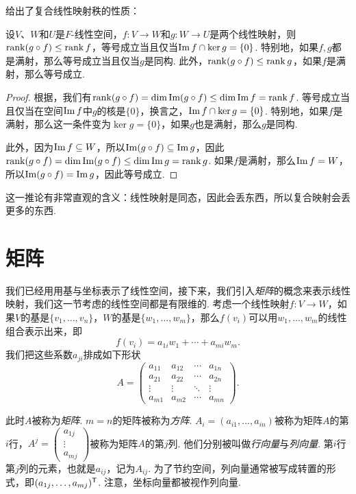  给出了复合线性映射秩的性质：
\begin{corollary}\label{cor:rank-composition}
设$V$、$W$和$U$是$F$-线性空间，$f:V\to W$和$g:W\to U$是两个线性映射，则$\operatorname*{rank} (g\circ f)\leq \operatorname*{rank} f$，等号成立当且仅当$\operatorname*{Im} f\cap \ker g=\{0\}$. 特别地，如果$f,g$都是满射，那么等号成立当且仅当$g$是同构. 此外，$\operatorname*{rank} (g\circ f)\leq \operatorname*{rank} g$，如果$f$是满射，那么等号成立. 
\end{corollary}
\begin{proof}
    根据，我们有$\operatorname*{rank} (g\circ f)=\dim\operatorname*{Im} (g\circ f)\leq \dim \operatorname*{Im} f=\operatorname*{rank} f$. 等号成立当且仅当在空间$\operatorname*{Im} f$中$g$的核是$\{0\}$，换言之，$\operatorname*{Im} f\cap \ker g=\{0\}$. 特别地，如果$f$是满射，那么这一条件变为$\ker g=\{0\}$，如果$g$也是满射，那么$g$是同构. 
    
    此外，因为$\operatorname*{Im} f\subseteq W$，所以$\operatorname*{Im} (g\circ f)\subseteq \operatorname*{Im} g$，因此$\operatorname*{rank} (g\circ f)=\dim\operatorname*{Im} (g\circ f)\leq \dim \operatorname*{Im} g=\operatorname*{rank} g$. 如果$f$是满射，那么$\operatorname*{Im} f=W$，所以$\operatorname*{Im} (g\circ f)=\operatorname*{Im} g$，因此等号成立. 
\end{proof}

这一推论有非常直观的含义：线性映射是同态，因此会丢东西，所以复合映射会丢更多的东西. 

\section{矩阵}\label{sec:matrix}

我们已经用用基与坐标表示了线性空间，接下来，我们引入\emph{矩阵}的概念来表示线性映射，我们这一节考虑的线性空间都是有限维的. 考虑一个线性映射$f:V\to W$，如果$V$的基是$\{v_1,\dots,v_n\}$，$W$的基是$\{w_1,\dots,w_m\}$，那么$f(v_i)$可以用$w_1,\dots,w_m$的线性组合表示出来，即
\[f(v_i)=a_{1i}w_1+\cdots+a_{mi}w_m.\]
我们把这些系数$a_{ji}$排成如下形状
\[A=\begin{pmatrix}
a_{11}&a_{12}&\cdots&a_{1n}\\
a_{21}&a_{22}&\cdots&a_{2n}\\
\vdots&\vdots&\ddots&\vdots\\
a_{m1}&a_{m2}&\cdots&a_{mn}
\end{pmatrix}.\]

此时$A$被称为\emph{矩阵}. $m=n$的矩阵被称为\emph{方阵}. $A_i=(a_{i1},\dots,a_{in})$被称为矩阵$A$的第$i$行，$A^j=\begin{pmatrix}a_{1j}\\\vdots\\a_{mj}\end{pmatrix}$被称为矩阵$A$的第$j$列. 他们分别被叫做\emph{行向量}与\emph{列向量}. 第$i$行第$j$列的元素，也就是$a_{ij}$，记为$A_{ij}$. 为了节约空间，列向量通常被写成转置的形式，即$(a_{1j},\dots,a_{mj})^{\mathsf{T}}$. 注意，坐标向量都被视作列向量. 

